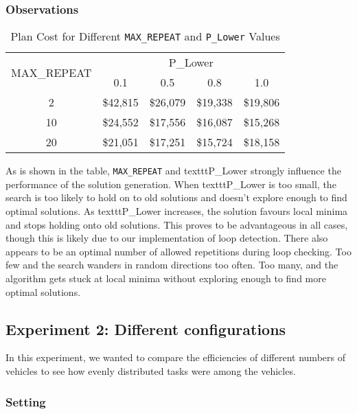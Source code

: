 \documentclass[11pt]{article}
\begin{document}
\subsubsection{Observations}


\begin{table}
	\centering
	\caption{Plan Cost for Different \texttt{MAX\_REPEAT} and \texttt{P\_Lower} Values}
	\begin{tabular}{|c|c|c|c|c|}
		\hline
		\multirow{2}{*}{MAX\_REPEAT} & \multicolumn{4}{c|}{P\_Lower} \\ \cline{2-5} 
		& 0.1 & 0.5 & 0.8 & 1.0 \\ \hline
		2 & \$42,815 & \$26,079 & \$19,338 & \$19,806 \\ \hline
		10 & \$24,552 & \$17,556 & \$16,087 & \$15,268 \\ \hline
		20 & \$21,051 & \$17,251 & \$15,724 & \$18,158 \\ \hline
	\end{tabular}
\end{table}


As is shown in the table, \texttt{MAX\_REPEAT} and texttt{P\_Lower} strongly influence the performance of the solution generation. When texttt{P\_Lower} is too small, the search is too likely to hold on to old solutions and doesn't explore enough to find optimal solutions. As texttt{P\_Lower} increases, the solution favours local minima and stops holding onto old solutions. This proves to be advantageous in all cases, though this is likely due to our implementation of loop detection. There also appears to be an optimal number of allowed repetitions during loop checking. Too few and the search wanders in random directions too often. Too many, and the algorithm gets stuck at local minima without exploring enough to find more optimal solutions.

\subsection{Experiment 2: Different configurations}
In this experiment, we wanted to compare the efficiencies of different numbers of vehicles to see how evenly distributed tasks were among the vehicles. 
\subsubsection{Setting}
\end{document}
